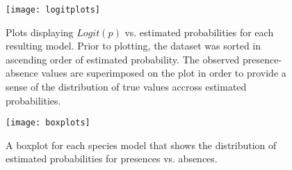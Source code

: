 \begin{figure}
    \texttt{[image: logitplots]}
    \caption{
        Plots displaying $Logit(p)$ vs. estimated probabilities for each resulting model.
        Prior to plotting, the dataset was sorted in ascending order of estimated probability.
        The observed presence-absence values are superimposed on the plot in order to provide a sense of the
        distribution of true values accross estimated probabilities.
    }
    \label{fig:logitplots}
\end{figure}


\begin{figure}
    \texttt{[image: boxplots]}
    \caption{
        A boxplot for each species model that shows the distribution of estimated probabilities for presences vs. absences.
    }
    \label{fig:boxplots}
\end{figure}


